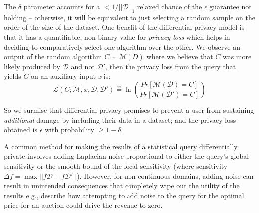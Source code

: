 \documentclass[letterpaper]{article}
\begin{document}
The \begin{math} \delta \end{math} parameter accounts for a $  < 1 / ||\mathcal{D}||_1 $ relaxed chance of the \begin{math} \epsilon \end{math} guarantee not holding -- otherwise, it will be equivalent to just selecting a random sample on the order of the size of the dataset. One benefit of the differential privacy model is that it has a quantifiable, non binary value for \textit{privacy loss} which helps in deciding to comparatively select one algorithm over the other. We observe an output of the random algorithm \begin{math} C \sim \mathcal{M}(D) \end{math} where we believe that \begin{math} C \end{math} was more likely produced by $\mathcal{D}$ and not $\mathcal{D'}$, then the privacy loss from the query that yields \begin{math} C \end{math} on an auxiliary input \textit{x} is: \begin{equation} \mathcal{L}(C;\mathcal{M},x,\mathcal{D},\mathcal{D'}) \overset{\underset{\mathrm{def}}{}}{=} \ln(\frac{Pr[\mathcal{M}(\mathcal{D}) = C]}{Pr[\mathcal{M}(\mathcal{D'}) = C]}) \end{equation}

So we surmise that differential privacy promises to prevent a user from sustaining \textit{additional} damage by including their data in a dataset; and the privacy loss obtained is \begin{math} \epsilon \end{math} with probability \begin{math} \ge 1-\delta \end{math}.

A common method for making the results of a statistical query differentially private involves adding Laplacian noise proportional to either the query's global sensitivity \cite{dwork2008differential,dwork2006calibrating} or the smooth bound of the local sensitivity \cite{nissim2007smooth} (where sensitivity $\Delta f = \max||f\mathcal{D} - f\mathcal{D}'||$). However, for non-continuous domains, adding noise can result in unintended consequences that completely wipe out the utility of the results e.g., \cite{dwork2014algorithmic} describe how attempting to add noise to the query for the optimal price for an auction could drive the revenue to zero.
\end{document}
